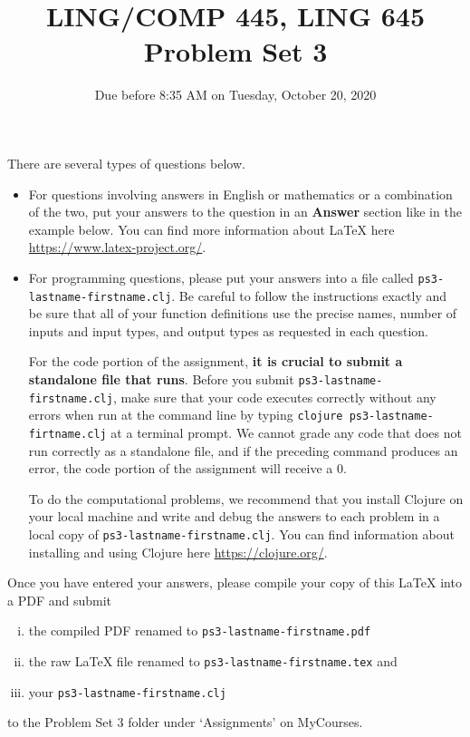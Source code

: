 \documentclass[10pt]{article}
\newcommand{\PSnum}{3}
\begin{document}
\title{LING/COMP 445, LING 645\\Problem Set \PSnum}
\date{Due before 8:35 AM on Tuesday, October 20, 2020}
\maketitle
There are several types of questions below. 
\begin{itemize}
\item
For questions involving answers in English or mathematics or a
combination of the two, put your answers to the question in an
\textbf{Answer} section like in the example below. You can find more
information about \LaTeX{} here \url{https://www.latex-project.org/}.

\item For programming questions,
please put your answers into a file called
\texttt{ps\PSnum-lastname-firstname.clj}. Be careful to follow the instructions
exactly and be sure that all of your function definitions use the
precise names, number of inputs and input types, and output types as
requested in each question.

For the code portion of the assignment, \textbf{it is crucial to submit a
standalone file that runs}. Before you submit \texttt{ps\PSnum-lastname-firstname.clj}, 
make sure that your code executes correctly without any errors 
when run at the command line by typing 
\texttt{clojure ps\PSnum-lastname-firtname.clj} at a terminal
prompt. We cannot grade any code that does not run correctly as a
standalone file, and if the preceding command produces an error,
the code portion of the assignment will receive a $0$.

To do the computational problems, we recommend that you install
Clojure on your local machine and write and debug the answers to each
problem in a local copy of \texttt{ps\PSnum-lastname-firstname.clj}. You can
find information about installing and using Clojure here
\url{https://clojure.org/}.
\end{itemize}
Once you have entered your answers, please compile your copy of this
\LaTeX{} into a PDF and submit 
\begin{enumerate}[(i),noitemsep]
\item
the compiled PDF renamed to
\texttt{ps\PSnum-lastname-firstname.pdf} 
\item
the raw \LaTeX{} file renamed to
\texttt{ps\PSnum-lastname-firstname.tex} and 
\item
your \texttt{ps\PSnum-lastname-firstname.clj}
\end{enumerate}
to the Problem Set \PSnum{} folder under `Assignments' on MyCourses.
\end{document}
